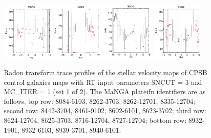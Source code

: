 \documentclass[fleqn,usenatbib]{mnras}
\begin{document}
\begin{figure}
    \includegraphics[width=0.23\textwidth]{Images/trace-plots/trace-plots-cpsb-controls/8932-1901.png}
    \includegraphics[width=0.23\textwidth]{Images/trace-plots/trace-plots-cpsb-controls/8932-6103.png}
    \includegraphics[width=0.23\textwidth]{Images/trace-plots/trace-plots-cpsb-controls/8939-3701.png}
    \includegraphics[width=0.23\textwidth]{Images/trace-plots/trace-plots-cpsb-controls/8940-6101.png}
    \caption{Radon transform trace profiles of the stellar velocity maps of CPSB control galaxies maps with RT input parameters SNCUT = 3 and MC\_ITER = 1 (set 1 of 2). The MaNGA plateifu identifiers are as follows, top row: 8084-6103, 8262-3703, 8262-12701, 8335-12704; second row: 8442-3704, 8461-9102, 8602-6101, 8623-3702; third row: 8624-12704, 8625-3703, 8716-12704, 8727-12704; bottom row: 8932-1901, 8932-6103, 8939-3701, 8940-6101.}
    \label{fig:Radon-traces-CPSB-controls-1}
\end{figure}
\end{document}
